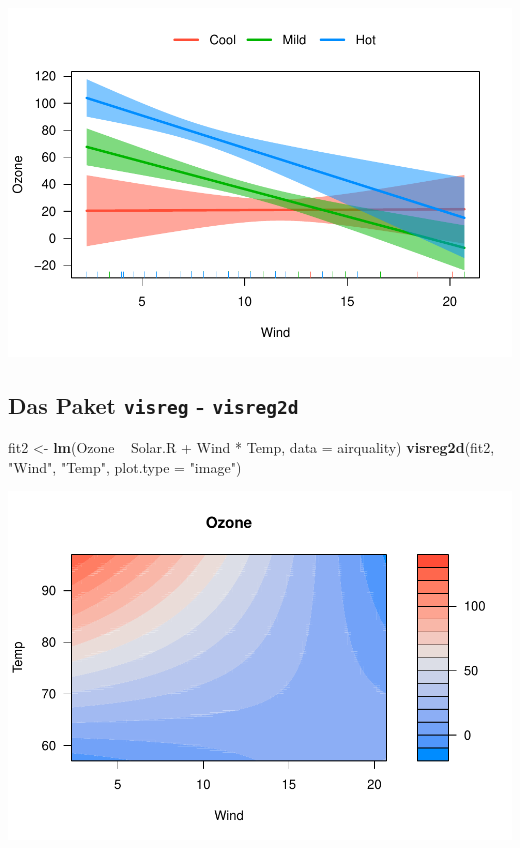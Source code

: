 \documentclass[]{article}
\newenvironment{Shaded}{\begin{snugshade}}{\end{snugshade}}
\newcommand{\KeywordTok}[1]{\textcolor[rgb]{0.13,0.29,0.53}{\textbf{{#1}}}}
\newcommand{\DataTypeTok}[1]{\textcolor[rgb]{0.13,0.29,0.53}{{#1}}}
\newcommand{\StringTok}[1]{\textcolor[rgb]{0.31,0.60,0.02}{{#1}}}
\newcommand{\NormalTok}[1]{{#1}}
\begin{document}
\includegraphics{Intro_Datenanalyse1_files/figure-latex/unnamed-chunk-286-1.pdf}

\subsection{\texorpdfstring{Das Paket \texttt{visreg} -
\texttt{visreg2d}}{Das Paket visreg - visreg2d}}\label{das-paket-visreg---visreg2d}

\begin{Shaded}
\begin{Highlighting}[]
\NormalTok{fit2 <-}\StringTok{ }\KeywordTok{lm}\NormalTok{(Ozone ~}\StringTok{ }\NormalTok{Solar.R +}\StringTok{ }\NormalTok{Wind *}\StringTok{ }\NormalTok{Temp, }\DataTypeTok{data =} \NormalTok{airquality)}
\KeywordTok{visreg2d}\NormalTok{(fit2, }\StringTok{"Wind"}\NormalTok{, }\StringTok{"Temp"}\NormalTok{, }\DataTypeTok{plot.type =} \StringTok{"image"}\NormalTok{)}
\end{Highlighting}
\end{Shaded}

\includegraphics{Intro_Datenanalyse1_files/figure-latex/unnamed-chunk-287-1.pdf}
\end{document}
